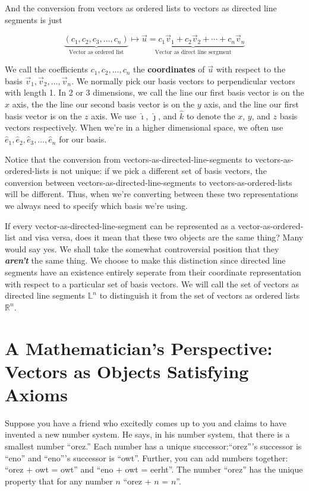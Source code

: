 And the conversion from vectors as ordered lists to vectors as directed line segments is just 

$$
 \underbrace{(c_1, c_2, c_3, \ldots, c_n)}_{\text{Vector as ordered list}} \mapsto \underbrace{\vec{u} = c_1 \vec{v}_1 + c_2 \vec{v}_2 + \cdots + c_n \vec{v}_n}_{\text{Vector as direct line sergment}}
$$

We call the coefficients $c_1, c_2, \ldots, c_n$ the \textbf{coordinates} of $\vec{u}$ with respect to the basis $\vec{v}_1, \vec{v}_2, \ldots, \vec{v}_n$. We normally pick our basis vectors to perpendicular vectors with length 1. In 2 or 3 dimensions, we call the line our first basis vector is on the $x$ axis, the the line our second basis vector is on the $y$ axis, and the line our first basis vector is on the $z$ axis. We use $\hat{\imath}$, $\hat{\jmath}$, and $\hat{k}$ to denote the $x$, $y$, and $z$ basis vectors respectively. When we're in a higher dimensional space, we often use $\hat{e}_1, \hat{e}_2, \hat{e}_3, \ldots, \hat{e}_n$ for our basis.

Notice that the conversion from vectors-as-directed-line-segments to vectors-as-ordered-lists is not unique: if we pick a different set of basis vectors, the conversion between vectors-as-directed-line-segments to vectors-as-ordered-lists will be different. Thus, when we're converting between these two representations we always need to specify which basis we're using.

\begin{remark}
	If every vector-as-directed-line-segment can be represented as a vector-as-ordered-list and visa versa, does it mean that these two objects are the same thing? Many would say yes. We shall take the somewhat controversial position that they \textbf{\textit{aren't}} the same thing. We choose to make this distinction since directed line segments have an existence entirely seperate from their coordinate representation with respect to a particular set of basis vectors. We will call the set of vectors as directed line segments $\mathbb{L}^n$ to distinguish it from the set of vectors as ordered lists $\mathbb{R}^n$.
\end{remark}

\section{A Mathematician's Perspective: Vectors as Objects Satisfying Axioms}

Suppose you have a friend who excitedly comes up to you and claims to have invented a new number system. He says, in his number system, that there is a smallest number ``orez.'' Each number has a unique successor:``orez'''s successor is ``eno'' and ``eno'''s successor is ``owt''. Further, you can add numbers together: ``orez + owt = owt'' and ``eno + owt = eerht''.  The number ``orez'' has the unique property that for any number $n$ ``orez + $n$ = $n$''.

